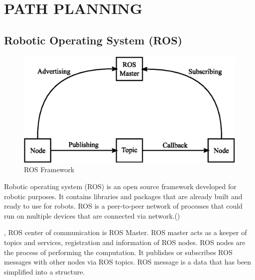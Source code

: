 \section{PATH PLANNING}
\subsection{Robotic Operating System (ROS)}
\begin{figure}[ht]
	\centering
	\includegraphics[scale=1]{images/imagess/6pp-ros.eps} 
	\caption{ROS Framework}
	\label{fig:ROS Framework}
\end{figure}
\hspace{1.27cm}
Robotic operating system (ROS) is an open source framework developed for robotic purposes. It contains libraries and packages that are already built and ready to use for robots. ROS is a peer-to-peer network of processes that could run on multiple devices that are connected via network.(\cite{rosabout})\par
\hspace{1.27cm}
\textbf{\figureautorefname{ \ref{fig:ROS Framework}}}, ROS center of communication is ROS Master. ROS master acts as a keeper of topics and services, registration and information of ROS nodes. ROS nodes are the process of performing the computation. It publishes or subscribes ROS messages with other nodes via ROS topics. ROS message is a data that has been simplified into a structure.\par

